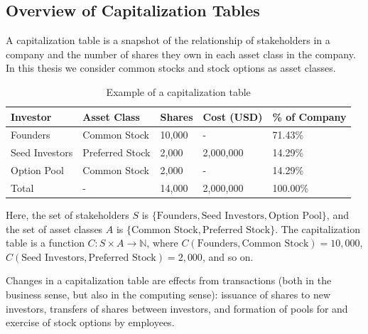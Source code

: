 \subsection{Overview of Capitalization Tables}


A capitalization table is a snapshot of the relationship of stakeholders in a company and the number of shares they own in each asset class in the company. In this thesis we consider common stocks and stock options as asset classes.

\begin{table}[h!]
\centering
	\begin{tabular}{|l|l|l|l|l|}
		\hline
		Investor       & Asset Class     & Shares & Cost (USD) & \% of Company \\
		\hline
		Founders       & Common Stock    & 10,000 & -          & 71.43\%       \\
		Seed Investors & Preferred Stock & 2,000  & 2,000,000  & 14.29\%       \\
		Option Pool    & Common Stock    & 2,000  & -          & 14.29\%       \\
		\hline
		Total          & -               & 14,000 & 2,000,000  & 100.00\%      \\
		\hline
	\end{tabular}
\caption{Example of a capitalization table}
\label{tab:example-capitalization-table}
\end{table}

Here, the set of stakeholders $S$ is $\{ \text{Founders}, \text{Seed Investors}, \text{Option Pool} \}$, and the set of asset classes $A$ is $\{ \text{Common Stock}, \text{Preferred Stock} \}$. The capitalization table is a function $C: S \times A \rightarrow \mathbb{N}$, where $C(\text{Founders}, \text{Common Stock}) = 10,000$, $C(\text{Seed Investors}, \text{Preferred Stock}) = 2,000$, and so on.

Changes in a capitalization table are effects from transactions (both in the business sense, but also in the computing sense): issuance of shares to new investors, transfers of shares between investors, and formation of pools for and exercise of stock options by employees.


